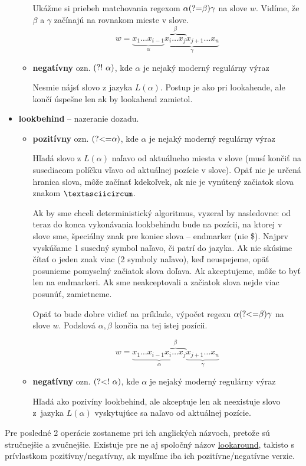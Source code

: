 \begin{itemize}
\begin{itemize}
Ukážme si priebeh matchovania regexom $\alpha\text{(?=}\beta)\gamma$ na slove $w$. Vidíme, že $\beta$ a $\gamma$ začínajú na rovnakom mieste v slove.
 $$w = \underbrace{x_1\dots x_{i-1}}_\alpha \underbrace{\overbrace{x_i \dots x_j}^\beta x_{j+1} \dots x_n }_\gamma$$ 
\item \textbf{negatívny} ozn. $\text{(?!~}\alpha)$, kde $\alpha$ je nejaký moderný regulárny výraz  

Nesmie nájsť slovo z jazyka $L(\alpha)$. Postup je ako pri lookaheade, ale končí úspešne len ak by lookahead zamietol.
\end{itemize}
\item \textbf{lookbehind} -- nazeranie dozadu.
\begin{itemize}
\item \textbf{pozitívny} ozn. $\text{(?\textless =}\alpha)$, kde $\alpha$ je nejaký moderný regulárny výraz 

Hľadá slovo z $L(\alpha)$ naľavo od aktuálneho miesta v slove (musí končiť na susediacom políčku vľavo od aktuálnej pozície v slove). Opäť nie je určená hranica slova, môže začínať kdekoľvek, ak nie je vynútený začiatok slova znakom $\textasciicircum$. 

Ak by sme chceli deterministický algoritmus, vyzeral by nasledovne: od teraz do konca vykonávania lookbehindu bude na pozícii, na ktorej v slove sme, špeciálny znak pre koniec slova -- endmarker (nie \$). Najprv vyskúšame 1 susedný symbol naľavo, či patrí do jazyka. Ak nie skúsime čítať o jeden znak viac (2 symboly naľavo), keď neuspejeme, opäť posunieme pomyselný začiatok slova doľava. Ak akceptujeme, môže to byť len na endmarkeri. Ak sme neakceptovali a začiatok slova nejde viac posunúť, zamietneme.

Opäť to bude dobre vidieť na príklade, výpočet regexu $\alpha\text{(?\textless =}\beta)\gamma$ na slove $w$. Podslová $\alpha,\beta$ končia na tej istej pozícii.

$$w = \underbrace{x_1\dots x_{i-1} \overbrace{x_i \dots x_j}^\beta}_\alpha \underbrace{x_{j+1} \dots x_n }_\gamma$$
\item \textbf{negatívny} ozn. $\text{(?\textless !~}\alpha)$, kde $\alpha$ je nejaký moderný regulárny výraz 

Hľadá ako pozivíny lookbehind, ale akceptuje len ak neexistuje slovo z~jazyka $L(\alpha)$ vyskytujúce sa naľavo od aktuálnej pozície.
\end{itemize}
\end{itemize}

Pre posledné 2 operácie zostaneme pri ich anglických názvoch, pretože sú stručnejšie a zvučnejšie. Existuje pre ne aj spoločný názov \underline{lookaround}, takisto s prívlastkom pozitívny/negatívny, ak myslíme iba ich pozitívne/negatívne verzie.


